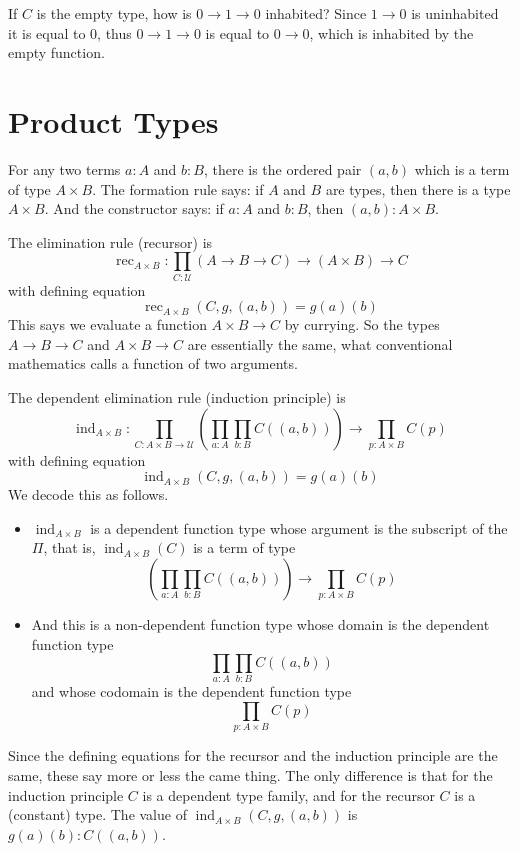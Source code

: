 \documentclass[11pt]{article}
\newcommand{\universe}{\mathcal{U}}
\DeclareMathOperator{\inductor}{ind}
\DeclareMathOperator{\recursor}{rec}
\begin{document}
If $C$ is the empty type, how is $0 \to 1 \to 0$ inhabited?  Since $1 \to 0$
is uninhabited it is equal to 0, thus $0 \to 1 \to 0$ is equal
to $0 \to 0$, which is inhabited by the empty function.

\section{Product Types}

For any two terms $a : A$ and $b : B$, there is the ordered pair $(a, b)$
which is a term of type $A \times B$.
The formation rule says: if $A$
and $B$ are types, then there is a type $A \times B$.  
And the constructor says: if $a : A$ and $b : B$, then $(a, b) : A \times B$.

The elimination rule (recursor) is
$$
   \recursor_{A \times B} : \prod_{C : \universe}
   (A \to B \to C) \to (A \times B) \to C
$$
with defining equation
$$
   \recursor_{A \times B}(C, g, (a, b)) = g(a)(b)
$$
This says we evaluate a function $A \times B \to C$ by currying.
So the types $A \to B \to C$ and $A \times B \to C$ are essentially the same,
what conventional mathematics calls a function of two arguments.

The dependent elimination rule (induction principle) is
$$
   \inductor_{A \times B} : \prod_{C : A \times B \to \universe}
   \left( \prod_{a : A} \prod_{b : B} C((a, b)) \right) \to
   \prod_{p : A \times B} C(p)
$$
with defining equation
$$
   \inductor_{A \times B}(C, g, (a, b)) = g(a)(b)
$$
We decode this as follows.
\begin{itemize}
\item $\inductor_{A \times B}$ is a dependent function type whose argument
    is the subscript of the $\Pi$, that is, $\inductor_{A \times B}(C)$
    is a term of type
$$
   \left( \prod_{a : A} \prod_{b : B} C((a, b)) \right) \to
   \prod_{p : A \times B} C(p)
$$
\item And this is a non-dependent function type whose domain is the
    dependent function type
$$
   \prod_{a : A} \prod_{b : B} C((a, b))
$$
and whose codomain is the dependent function type
$$
   \prod_{p : A \times B} C(p)
$$
\end{itemize}
Since the defining equations for the recursor and the induction principle
are the same, these say more or less the came thing.  The only difference
is that for the induction principle $C$ is a dependent type family,
and for the recursor $C$ is a (constant) type.
The value of $\inductor_{A \times B}(C, g, (a, b))$ is $g(a)(b) : C((a, b))$.
\end{document}
